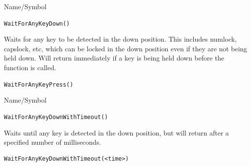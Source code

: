 \begin{desc}{Name/Symbol}
\item[Name/Symbol]  	\verb+WaitForAnyKeyDown()+

\item[Description]	
             Waits for any key to be detected in the down position.
             This includes numlock, capslock, etc, which can be locked
             in the down position even if they are not being held
             down.  Will return immediately if a key is being held
             down before the function is called. 

\item[Usage]		

\item[Example]	

\item[See Also]	
            \verb+WaitForAnyKeyPress()+
\end{desc}




\begin{desc}{Name/Symbol}
\item[Name/Symbol]  	\verb+WaitForAnyKeyDownWithTimeout()+

\item[Description] Waits until any key is detected in the down position, but will return
  after a specified number of milliseconds.

\item[Usage]
\begin{verbatim}
WaitForAnyKeyDownWithTimeout(<time>)
\end{verbatim}

\item[Example]	

\item[See Also]	
\end{desc}




